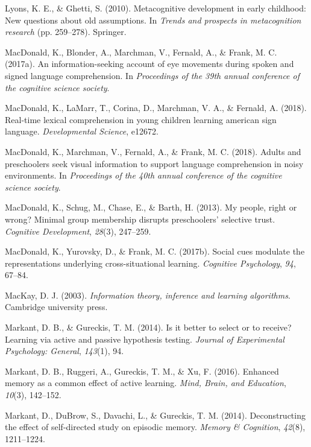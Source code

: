 \documentclass[oneside]{report}
\begin{document}
\hypertarget{ref-lyons2010metacognitive}{}
Lyons, K. E., \& Ghetti, S. (2010). Metacognitive development in early
childhood: New questions about old assumptions. In \emph{Trends and
prospects in metacognition research} (pp. 259--278). Springer.

\hypertarget{ref-macdonald2017info}{}
MacDonald, K., Blonder, A., Marchman, V., Fernald, A., \& Frank, M. C.
(2017a). An information-seeking account of eye movements during spoken
and signed language comprehension. In \emph{Proceedings of the 39th
annual conference of the cognitive science society}.

\hypertarget{ref-macdonald2018real}{}
MacDonald, K., LaMarr, T., Corina, D., Marchman, V. A., \& Fernald, A.
(2018). Real-time lexical comprehension in young children learning
american sign language. \emph{Developmental Science}, e12672.

\hypertarget{ref-macdonald2018noise}{}
MacDonald, K., Marchman, V., Fernald, A., \& Frank, M. C. (2018). Adults
and preschoolers seek visual information to support language
comprehension in noisy environments. In \emph{Proceedings of the 40th
annual conference of the cognitive science society}.

\hypertarget{ref-macdonald2013my}{}
MacDonald, K., Schug, M., Chase, E., \& Barth, H. (2013). My people,
right or wrong? Minimal group membership disrupts preschoolers'
selective trust. \emph{Cognitive Development}, \emph{28}(3), 247--259.

\hypertarget{ref-macdonald2017social}{}
MacDonald, K., Yurovsky, D., \& Frank, M. C. (2017b). Social cues
modulate the representations underlying cross-situational learning.
\emph{Cognitive Psychology}, \emph{94}, 67--84.

\hypertarget{ref-mackay2003information}{}
MacKay, D. J. (2003). \emph{Information theory, inference and learning
algorithms}. Cambridge university press.

\hypertarget{ref-markant2014better}{}
Markant, D. B., \& Gureckis, T. M. (2014). Is it better to select or to
receive? Learning via active and passive hypothesis testing.
\emph{Journal of Experimental Psychology: General}, \emph{143}(1), 94.

\hypertarget{ref-markant2016enhanced}{}
Markant, D. B., Ruggeri, A., Gureckis, T. M., \& Xu, F. (2016). Enhanced
memory as a common effect of active learning. \emph{Mind, Brain, and
Education}, \emph{10}(3), 142--152.

\hypertarget{ref-markant2014deconstructing}{}
Markant, D., DuBrow, S., Davachi, L., \& Gureckis, T. M. (2014).
Deconstructing the effect of self-directed study on episodic memory.
\emph{Memory \& Cognition}, \emph{42}(8), 1211--1224.
\end{document}
